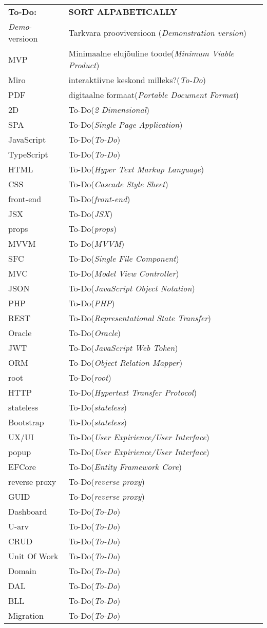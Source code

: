 \begin{longtable}{p{3cm}p{10cm}}
\textbf{To-Do:}&\textbf{SORT ALPABETICALLY}\\
\textit{Demo}-versioon&Tarkvara prooviversioon (\emph{Demonstration version})\\
MVP&Minimaalne elujõuline toode(\emph{Minimum Viable Product})\\
Miro&interaktiivne keskond milleks?(\emph{To-Do})\\
PDF&digitaalne formaat(\emph{Portable Document Format})\\
2D&To-Do(\emph{2 Dimensional})\\
SPA&To-Do(\emph{Single Page Application})\\
JavaScript&To-Do(\emph{To-Do})\\
TypeScript&To-Do(\emph{To-Do})\\
HTML&To-Do(\emph{Hyper Text Markup Language})\\
CSS&To-Do(\emph{Cascade Style Sheet})\\
front-end&To-Do(\emph{front-end})\\
JSX&To-Do(\emph{JSX})\\
props&To-Do(\emph{props})\\
MVVM&To-Do(\emph{MVVM})\\
SFC&To-Do(\emph{Single File Component})\\
MVC&To-Do(\emph{Model View Controller})\\
JSON&To-Do(\emph{JavaScript Object Notation})\\
PHP&To-Do(\emph{PHP})\\
REST&To-Do(\emph{Representational State Transfer})\\
Oracle&To-Do(\emph{Oracle})\\
JWT&To-Do(\emph{JavaScript Web Token})\\
ORM&To-Do(\emph{Object Relation Mapper})\\
root&To-Do(\emph{root})\\
HTTP&To-Do(\emph{Hypertext Transfer Protocol})\\
stateless&To-Do(\emph{stateless})\\
Bootstrap&To-Do(\emph{stateless})\\
UX/UI&To-Do(\emph{User Expirience/User Interface})\\
popup&To-Do(\emph{User Expirience/User Interface})\\
EFCore&To-Do(\emph{Entity Framework Core})\\
reverse proxy&To-Do(\emph{reverse proxy})\\
GUID&To-Do(\emph{reverse proxy})\\
Dashboard&To-Do(\emph{To-Do})\\
U-arv&To-Do(\emph{To-Do})\\
CRUD&To-Do(\emph{To-Do})\\
Unit Of Work&To-Do(\emph{To-Do})\\
Domain&To-Do(\emph{To-Do})\\
DAL&To-Do(\emph{To-Do})\\
BLL&To-Do(\emph{To-Do})\\
Migration&To-Do(\emph{To-Do})\\

\end{longtable}
\addtocounter{table}{-1} 